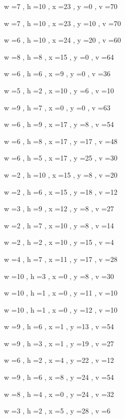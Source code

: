 \documentclass[11pt]{article}
\begin{document}
w =7 , h =10 , x =23 , y =0 , v =70
\par
w =7 , h =10 , x =23 , y =10 , v =70
\par
w =6 , h =10 , x =24 , y =20 , v =60
\par
w =8 , h =8 , x =15 , y =0 , v =64
\par
w =6 , h =6 , x =9 , y =0 , v =36
\par
w =5 , h =2 , x =10 , y =6 , v =10
\par
w =9 , h =7 , x =0 , y =0 , v =63
\par
w =6 , h =9 , x =17 , y =8 , v =54
\par
w =6 , h =8 , x =17 , y =17 , v =48
\par
w =6 , h =5 , x =17 , y =25 , v =30
\par
w =2 , h =10 , x =15 , y =8 , v =20
\par
w =2 , h =6 , x =15 , y =18 , v =12
\par
w =3 , h =9 , x =12 , y =8 , v =27
\par
w =2 , h =7 , x =10 , y =8 , v =14
\par
w =2 , h =2 , x =10 , y =15 , v =4
\par
w =4 , h =7 , x =11 , y =17 , v =28
\par
w =10 , h =3 , x =0 , y =8 , v =30
\par
w =10 , h =1 , x =0 , y =11 , v =10
\par
w =10 , h =1 , x =0 , y =12 , v =10
\par
w =9 , h =6 , x =1 , y =13 , v =54
\par
w =9 , h =3 , x =1 , y =19 , v =27
\par
w =6 , h =2 , x =4 , y =22 , v =12
\par
w =9 , h =6 , x =8 , y =24 , v =54
\par
w =8 , h =4 , x =0 , y =24 , v =32
\par
w =3 , h =2 , x =5 , y =28 , v =6
\par
\newpage


\end{document}
